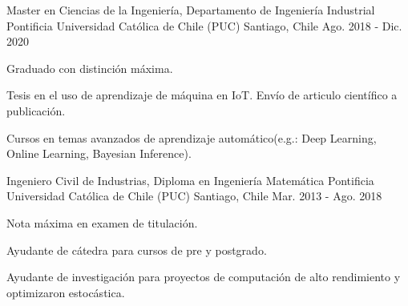 

\begin{cventries}
\cventry
{Master en Ciencias de la Ingeniería, Departamento de Ingeniería Industrial} %
{Pontificia Universidad Católica de Chile (PUC)} %
{Santiago, Chile} %
{Ago. 2018 - Dic. 2020} %
{
  \begin{cvitems} %
    \item {Graduado con distinción máxima.}
    \item {Tesis en el uso de aprendizaje de máquina en IoT. Envío de articulo científico a publicación.}
    \item {Cursos en temas avanzados de aprendizaje automático(e.g.: Deep Learning, Online Learning, Bayesian Inference).} 
  \end{cvitems}
}

  \cventry
    {Ingeniero Civil de Industrias, Diploma en Ingeniería Matemática} %
    {Pontificia Universidad Católica de Chile (PUC)} %
    {Santiago, Chile} %
    {Mar. 2013 - Ago. 2018} %
    {
      \begin{cvitems} %
        \item {Nota máxima en examen de titulación.}
        \item {Ayudante de cátedra para cursos de pre y postgrado.}
        \item {Ayudante de investigación para proyectos de computación de alto rendimiento y optimizaron estocástica.}
      \end{cvitems}
    }

\end{cventries}
